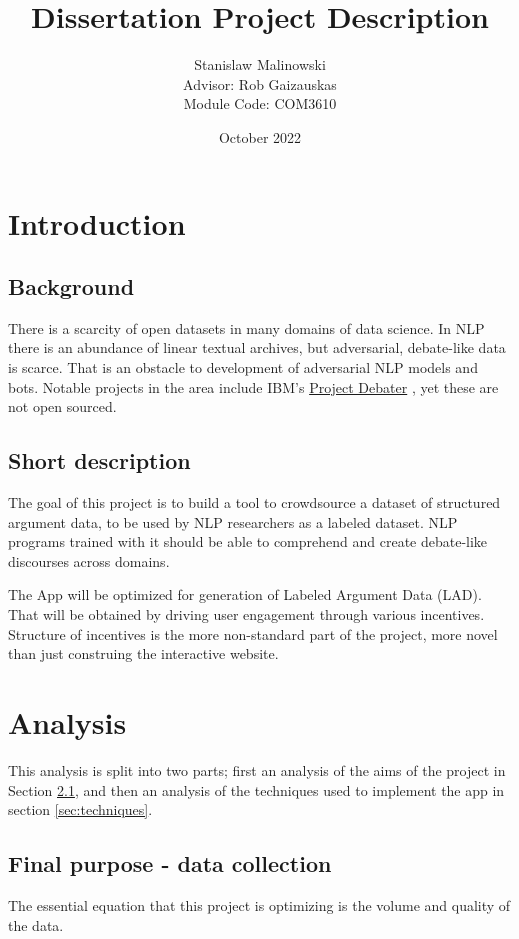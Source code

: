 \documentclass{article}
\title{Dissertation Project Description}
\author{Stanislaw Malinowski
\\[1cm]{\small Advisor: Rob Gaizauskas}
\\[1cm]{\small Module Code: COM3610}
}
\date{October 2022}
\begin{document}
\maketitle

\tableofcontents
\newpage

\section{Introduction}

\subsection{Background}
There is a scarcity of open datasets in many domains of data science. In NLP there is an abundance of linear textual archives, but adversarial, debate-like data is scarce.
That is an obstacle to development of adversarial NLP models and bots. Notable projects in the area include IBM's \href{https://research.ibm.com/interactive/project-debater/}{Project Debater} \cite{slonim2021autonomous}, yet these are not open sourced.

\subsection{Short description}
The goal of this project is to build a tool to crowdsource a dataset of structured argument data, to be used by NLP researchers as a labeled dataset.
NLP programs trained with it should be able to comprehend and create debate-like discourses across domains.

The App will be optimized for generation of Labeled Argument Data (LAD).
That will be obtained by driving user engagement through various incentives. 
Structure of incentives is the more non-standard part of the project, more novel than just construing the interactive website.

\section{Analysis}

This analysis is split into two parts; first an analysis of the aims of the project in Section \ref{sec:purpose}, and then an analysis of the techniques used to implement the app in section \ref{sec:techniques}.

\subsection{Final purpose - data collection}\label{sec:purpose}
The essential equation that this project is optimizing is the volume and quality of the data.
\end{document}
